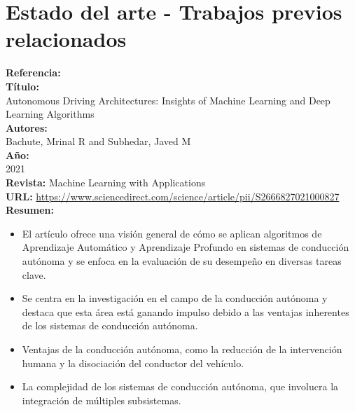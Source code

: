 \documentclass[10pt,letterpaper,final]{article}
\begin{document}
    \section*{Estado del arte - Trabajos previos relacionados}
    \newline
    \begin{longtable}
        \hline
        \noindent \textbf{Referencia:}~\cite{bachute2021autonomous}                                    \\
        \textbf{Título:}                                                                               \\
        Autonomous Driving Architectures: Insights of Machine Learning and Deep Learning Algorithms \\
        \textbf{Autores:}                                                                              \\
        Bachute, Mrinal R and Subhedar, Javed M                                                        \\
        \textbf{Año:}                                                                                  \\
        2021                                                                                           \\
        \textbf{Revista:}
        Machine Learning with Applications                                                             \\
        \textbf{URL:}
        \url{https://www.sciencedirect.com/science/article/pii/S2666827021000827}                      \\
        \textbf{Resumen:}
        \begin{itemize}
            \item El artículo ofrece una visión general de cómo se aplican algoritmos de Aprendizaje Automático y Aprendizaje
            Profundo en sistemas de conducción autónoma y se enfoca en la evaluación de su desempeño en diversas tareas clave.
            \item Se centra en la investigación en el campo de la conducción autónoma y destaca que esta área está ganando
            impulso debido a las ventajas inherentes de los sistemas de conducción autónoma.
            \item Ventajas de la conducción autónoma, como la reducción de la intervención humana y la disociación del conductor del vehículo.
            \item La complejidad de los sistemas de conducción autónoma, que involucra la integración de múltiples subsistemas.

\end{itemize}
\end{longtable}
\end{document}
